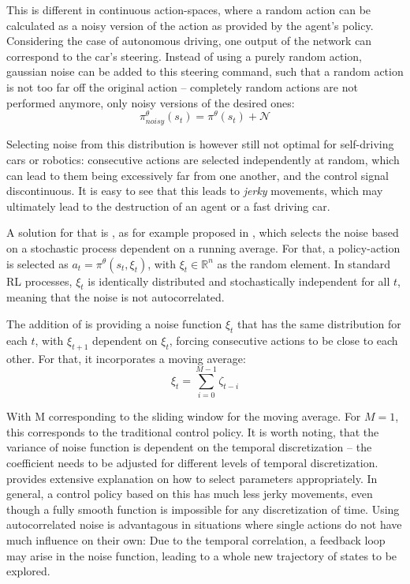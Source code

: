 This is different in continuous action-spaces, where a random action can be calculated as a noisy version of the action as provided by the agent's policy. Considering the case of autonomous driving, one output of the network can correspond to the car's steering. Instead of using a purely random action, gaussian noise can be added to this steering command, such that a random action is not too far off the original action -- completely random actions are not performed anymore, only noisy versions of the desired ones:
\begin{equation*}
	\pi^\theta_{noisy}(s_t) = \pi^\theta(s_t) + \mathcal{N}
\end{equation*}

Selecting noise from this distribution is however still not optimal for self-driving cars or robotics: consecutive actions are selected independently at random, which can lead to them being excessively far from one another, and the control signal discontinuous. It is easy to see that this leads to \textit{jerky} movements, which may ultimately lead to the destruction of an agent or a fast driving car. 

A solution for that is , as for example proposed in \cite{wawrzynski_control_2015}, which selects the noise based on a stochastic process dependent on a running average. For that, a policy-action is selected as $a_t = \pi^\theta(s_t, \xi_t)$, with $\xi_t \in \mathds{R}^n$ as the random element. In standard RL processes, $\xi_t$ is identically distributed and stochastically independent for all $t$, meaning that the noise is not autocorrelated.

The addition of \cite{wawrzynski_control_2015} is providing a noise function $\xi_t$ that has the same distribution for each $t$, with $\xi_{t+1}$ dependent on $\xi_t$, forcing consecutive actions to be close to each other. For that, it incorporates a moving average:\\
\begin{equation*}
	\xi_t = \sum^{M-1}_{i=0} \zeta_{t-i}
\end{equation*}

With M corresponding to the sliding window for the moving average. For $M=1$, this corresponds to the traditional control policy. It is worth noting, that the variance of noise function is dependent on the temporal discretization -- the coefficient needs to be adjusted for different levels of temporal discretization. \cite{wawrzynski_control_2015} provides extensive explanation on how to select parameters appropriately. In general, a control policy based on this has much less jerky movements, even though a fully smooth function is impossible for any discretization of time. Using autocorrelated noise is advantagous in situations where single actions do not have much influence on their own: Due to the temporal correlation, a feedback loop may arise in the noise function, leading to a whole new trajectory of states to be explored.


